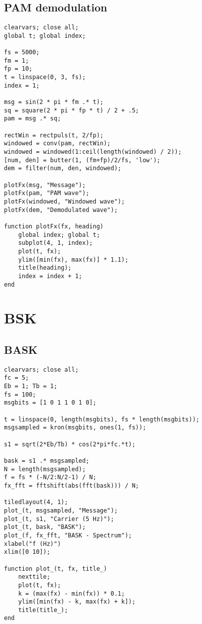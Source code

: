 \documentclass[12pt,a4paper]{article}
\newcommand{\sectiona}[1]{\pagebreak \section{\centering #1}}
\begin{document}
\subsection{PAM demodulation}
\begin{verbatim}
clearvars; close all;
global t; global index;

fs = 5000;
fm = 1;
fp = 10;
t = linspace(0, 3, fs);
index = 1;

msg = sin(2 * pi * fm .* t);
sq = square(2 * pi * fp * t) / 2 + .5;
pam = msg .* sq;

rectWin = rectpuls(t, 2/fp);
windowed = conv(pam, rectWin);
windowed = windowed(1:ceil(length(windowed) / 2));
[num, den] = butter(1, (fm+fp)/2/fs, 'low');
dem = filter(num, den, windowed);

plotFx(msg, "Message");
plotFx(pam, "PAM wave");
plotFx(windowed, "Windowed wave");
plotFx(dem, "Demodulated wave");

function plotFx(fx, heading)
    global index; global t;
    subplot(4, 1, index);
    plot(t, fx);
    ylim([min(fx), max(fx)] * 1.1);
    title(heading);
    index = index + 1;
end
\end{verbatim}
\sectiona{BSK}
\subsection{BASK}
\begin{verbatim}
clearvars; close all;
fc = 5;
Eb = 1; Tb = 1;
fs = 100;
msgbits = [1 0 1 1 0 1 0];

t = linspace(0, length(msgbits), fs * length(msgbits));
msgsampled = kron(msgbits, ones(1, fs));

s1 = sqrt(2*Eb/Tb) * cos(2*pi*fc.*t);

bask = s1 .* msgsampled;
N = length(msgsampled);
f = fs * (-N/2:N/2-1) / N;
fx_fft = fftshift(abs(fft(bask))) / N;

tiledlayout(4, 1);
plot_(t, msgsampled, "Message");
plot_(t, s1, "Carrier (5 Hz)");
plot_(t, bask, "BASK");
plot_(f, fx_fft, "BASK - Spectrum");
xlabel("f (Hz)")
xlim([0 10]);

function plot_(t, fx, title_)
    nexttile;
    plot(t, fx);
    k = (max(fx) - min(fx)) * 0.1;
    ylim([min(fx) - k, max(fx) + k]);
    title(title_);
end
\end{verbatim}
\end{document}
